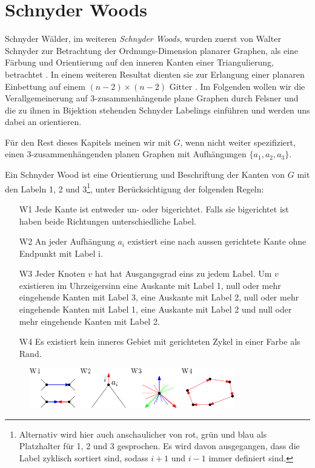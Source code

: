 \section{Schnyder Woods}\label{sw}
Schnyder Wälder, im weiteren \textit{Schnyder Woods}, wurden zuerst von Walter Schnyder zur Betrachtung der Ordnungs-Dimension planarer Graphen, als eine Färbung und Orientierung auf den inneren Kanten einer Triangulierung, betrachtet \cite{schnyder89}. In einem weiteren Resultat dienten sie zur Erlangung einer planaren Einbettung auf einem $(n-2)\times(n-2)$ Gitter \cite{schnyder90}. Im Folgenden wollen wir die Verallgemeinerung auf 3-zusammenhängende plane Graphen durch Felsner \cite{felsner01} und die zu ihnen in Bijektion stehenden Schnyder Labelings einführen und werden uns dabei an \cite{felsner04} orientieren.\

Für den Rest dieses Kapitels meinen wir mit $G$, wenn nicht weiter spezifiziert, einen 3-zusammenhängenden planen Graphen mit Aufhängungen $\{a_1,a_2,a_3\}$.

\begin{definition}
Ein Schnyder Wood ist eine Orientierung und Beschriftung der Kanten von $G$ mit den Labeln 1, 2 und 3\footnote{Alternativ wird hier auch anschaulicher von rot, grün und blau als Platzhalter für 1, 2 und 3 gesprochen. Es wird davon ausgegangen, dass die Label zyklisch sortiert sind, sodass $i+1$ und $i-1$ immer definiert sind.}, unter Berücksichtigung der folgenden Regeln:
\begin{itemize}
\item[W1] Jede Kante ist entweder un- oder bigerichtet. Falls sie bigerichtet ist haben beide Richtungen unterschiedliche Label.
\item[W2] An jeder Aufhängung  $a_i$ existiert eine nach aussen gerichtete Kante ohne Endpunkt mit Label i.  
\item[W3] Jeder Knoten $v$ hat hat Ausgangsgrad eins zu jedem Label. Um $v$ existieren im Uhrzeigersinn eine Auskante mit Label 1, null oder mehr eingehende Kanten mit Label 3, eine Auskante mit Label 2, null oder mehr  eingehende Kanten mit Label 1, eine Auskante mit Label 2 und null oder mehr  eingehende Kanten mit Label 2.
\item[W4] Es existiert kein inneres Gebiet mit gerichteten Zykel in einer Farbe als Rand.
\end{itemize}
\end{definition}

\begin{figure}[h]
	\centering
  \includegraphics[width=0.8\textwidth]{schnyder_wood_def.png}
\end{figure}

